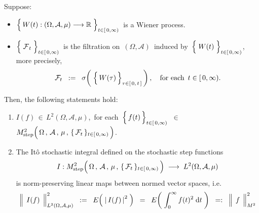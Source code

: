 \vskip 0.5cm
\begin{proposition}
\label{ItoIsometryForStepProcesses}
\mbox{}
\vskip 0.2cm
\noindent
Suppose:
\begin{itemize}
\item
	$\left\{\,\overset{{\color{white}.}}{W}(t) : (\Omega,\mathcal{A},\mu) \longrightarrow \Re \;\right\}_{t \in[\,0,\infty)}$\,
	is a Wiener process.
\item
	$\left\{\;\overset{{\color{white}.}}{\mathcal{F}}_{t}\;\right\}_{t\in[\,0,\infty)}$\,
	is the filtration on \,$(\Omega,\mathcal{A})$\, induced by
	\,$\left\{\;\overset{{\color{white}.}}{W}(t)\;\right\}_{t\in[\,0,\infty)}$,\,
	more precisely,
	\begin{equation*}
	\mathcal{F}_{t}
	\;\; := \;\;
		\sigma\!\left(\;\left\{\,\overset{{\color{white}.}}{W}(\tau)\,\right\}_{\tau\in[\,0,\,t\,]}\,\right),
	\quad
	\textnormal{for each \,$t \in [\,0,\infty)$}.
	\end{equation*}
\end{itemize}
Then, the following statements hold:
\begin{enumerate}
\item
	$I(f) \,\in\, L^{2}(\Omega,\mathcal{A},\mu)$,\,
	for each
	\,$\left\{\,\overset{{\color{white}.}}{f}(t)\,\right\}_{t\in[\,0,\infty)}$\,
	$\in$
	\,$M^{2}_{\textnormal{step}}\!
	\left(\,
		\overset{{\color{white}.}}{\Omega} \,,\, \mathcal{A} \,,\, \mu \,,\, \{\,\mathcal{F}_{t}\,\}_{t \in [\,0,\infty)}
		\,\right)$.
\item
	The It\^{o} stochastic integral defined on the stochastic step functions
	\begin{equation*}
	I : M^{2}_{\textnormal{step}}\!
		\left(\,
			\overset{{\color{white}.}}{\Omega} \,,\, \mathcal{A} \,,\, \mu \,,\, \{\,\mathcal{F}_{t}\,\}_{t \in [\,0,\infty)}
			\,\right)
	\; \longrightarrow \;
	L^{2}(\Omega,\mathcal{A},\mu)
	\end{equation*}
	is norm-preserving linear maps between normed vector spaces, i.e.
	\begin{equation*}
	\left\Vert\;\, \overset{{\color{white}.}}{I(f)} \,\;\right\Vert_{L^{2}(\Omega,\mathcal{A},\mu)}^{2}
	\;\; := \;\;
		E\!\left(\; \left\vert\, I(f) \,\right\vert^{2} \;\right)
	\;\; = \;\;
		E\!\left(\; \int_{0}^{\infty} f(t)^{2} \;\d t \;\right)
	\;\; =: \;\;
		\left\Vert\;\, \overset{{\color{white}.}}{f} \,\;\right\Vert_{M^{2}}^{2}
	\end{equation*}
\end{enumerate}
\end{proposition}
